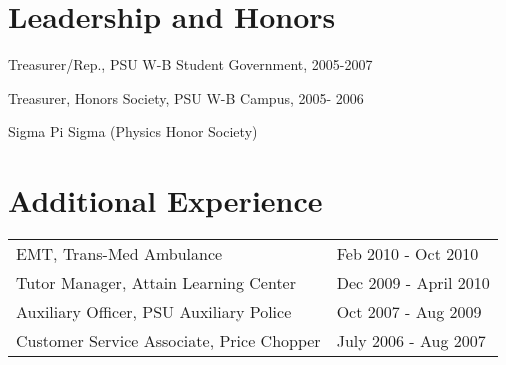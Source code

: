 \documentclass[]{deedy-resume-openfont}
\begin{document}
\begin{minipage}[t]{0.63\textwidth}



\section {Leadership and Honors}
\vspace{\topsep}
\begin{tightemize}	
	\regdescript
	\item Treasurer/Rep., PSU W-B Student Government,  2005-2007\\
\item Treasurer, Honors Society, PSU W-B Campus, 2005- 2006 \\
\item Sigma Pi Sigma (Physics Honor Society)\\
\end{tightemize}
\sectionsep



\section {Additional Experience}
\regdescript
\begin{tabular}{ll}


 EMT, Trans-Med Ambulance & Feb 2010 - Oct 2010\\
 Tutor Manager, Attain Learning Center & Dec 2009 - April 2010\\
 Auxiliary Officer, PSU Auxiliary Police & Oct 2007 - Aug 2009 \\
Customer Service Associate, Price Chopper & July 2006 - Aug 2007\\

\end{tabular}

\sectionsep

\end{minipage} 
\end{document}

